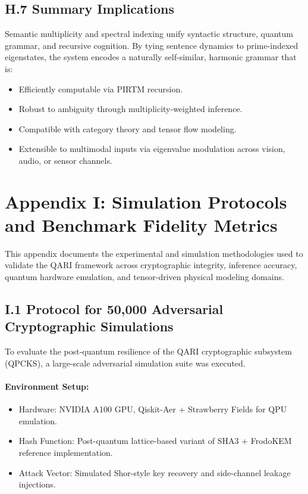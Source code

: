\documentclass[12pt]{article}
\begin{document}
\begin{itemize}
\subsection*{H.7 Summary Implications}

Semantic multiplicity and spectral indexing unify syntactic structure, quantum grammar, and recursive cognition. By tying sentence dynamics to prime-indexed eigenstates, the system encodes a naturally self-similar, harmonic grammar that is:
\begin{itemize}
    \item Efficiently computable via PIRTM recursion.
    \item Robust to ambiguity through multiplicity-weighted inference.
    \item Compatible with category theory and tensor flow modeling.
    \item Extensible to multimodal inputs via eigenvalue modulation across vision, audio, or sensor channels.
\end{itemize}
\section*{Appendix I: Simulation Protocols and Benchmark Fidelity Metrics}

This appendix documents the experimental and simulation methodologies used to validate the QARI framework across cryptographic integrity, inference accuracy, quantum hardware emulation, and tensor-driven physical modeling domains.

\subsection*{I.1 Protocol for 50{,}000 Adversarial Cryptographic Simulations}

To evaluate the post-quantum resilience of the QARI cryptographic subsystem (QPCKS), a large-scale adversarial simulation suite was executed.

\paragraph{Environment Setup:}
\begin{itemize}
    \item Hardware: NVIDIA A100 GPU, Qiskit-Aer + Strawberry Fields for QPU emulation.
    \item Hash Function: Post-quantum lattice-based variant of SHA3 + FrodoKEM reference implementation.
    \item Attack Vector: Simulated Shor-style key recovery and side-channel leakage injections.
\end{itemize}


\end{itemize}
\end{document}
